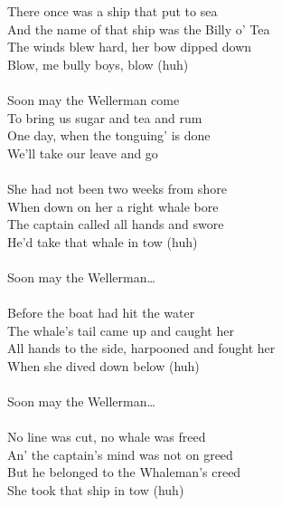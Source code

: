 
            There once was a ship that put to sea \\
            And the name of that ship was the Billy o' Tea \\
            The winds blew hard, her bow dipped down \\
            Blow, me bully boys, blow (huh) \\
\hspace{10mm} \\
            Soon may the Wellerman come \\
            To bring us sugar and tea and rum \\
            One day, when the tonguing' is done \\
            We'll take our leave and go \\
\hspace{10mm} \\
            She had not been two weeks from shore \\
            When down on her a right whale bore \\
            The captain called all hands and swore \\
            He'd take that whale in tow (huh) \\
\hspace{10mm} \\
            Soon may the Wellerman… \\
\hspace{10mm} \\
            Before the boat had hit the water \\
            The whale's tail came up and caught her \\
            All hands to the side, harpooned and fought her \\
            When she dived down below (huh) \\
\hspace{10mm} \\
            Soon may the Wellerman… \\
\hspace{10mm} \\
            No line was cut, no whale was freed \\
            An' the captain's mind was not on greed \\
            But he belonged to the Whaleman's creed \\
            She took that ship in tow (huh) \\
